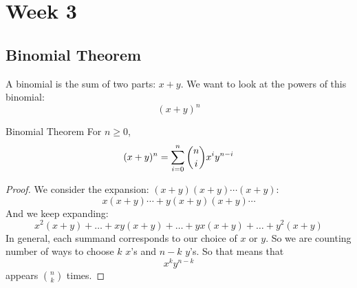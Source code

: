 \documentclass{report}
\begin{document}
\chapter{Week 3}

\begin{topic}
    \section{Binomial Theorem}
\end{topic}

A binomial is the sum of two parts: $x + y$. We want to look at the powers of this binomial:
    \begin{equation*}
        (x + y)^{n}
    \end{equation*}
\begin{theorem}{Binomial Theorem}
    For $n \geq 0$, 
        \begin{equation*}
            (x + y)^{n} = \sum_{i =0}^{n} \dbinom{n}{i}x^{i}y^{n - i}
        \end{equation*}
\end{theorem}
    \begin{proof}
        We consider the expansion: $(x + y)(x + y)\cdots(x + y)$:
            \begin{equation*}
                x(x + y)\cdots + y(x + y)(x + y) \cdots
            \end{equation*}
        And we keep expanding:
            \begin{equation*}
                x^{2}(x + y) + \ldots + xy(x + y) + \ldots + yx(x + y) + \ldots + y^{2}(x + y)
            \end{equation*}
        In general, each summand corresponds to our choice of $x$ or $y$. So we are counting number of ways to choose $k$ $x$'s and $n - k$ $y$'s. So that means that
            \begin{equation*}
                x^{k}y^{n - k}
            \end{equation*}
        appears $\binom{n}{k}$ times.
    \end{proof}
\end{document}
